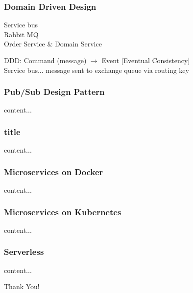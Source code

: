 \documentclass{beamer}
\begin{document}
\begin{frame}\frametitle{Domain Driven Design}
	Service bus\\
	Rabbit MQ\\
	Order Service \& Domain Service

	DDD: Command (message) $\rightarrow$ Event [Eventual Consistency]\\
	
	Service bus... message sent to exchange queue via routing key
\end{frame}

\begin{frame}\frametitle{Pub/Sub Design Pattern}
content...
\end{frame}


\begin{frame}\frametitle{title}
content...
\end{frame}

\begin{frame}\frametitle{Microservices on Docker}
	content...
\end{frame}

\begin{frame}\frametitle{Microservices on Kubernetes}
content...
\end{frame}

\begin{frame}\frametitle{Serverless}
content...
\end{frame}




\begin{frame}
\Huge{\centerline{Thank You!}}
\end{frame}

\end{document}
